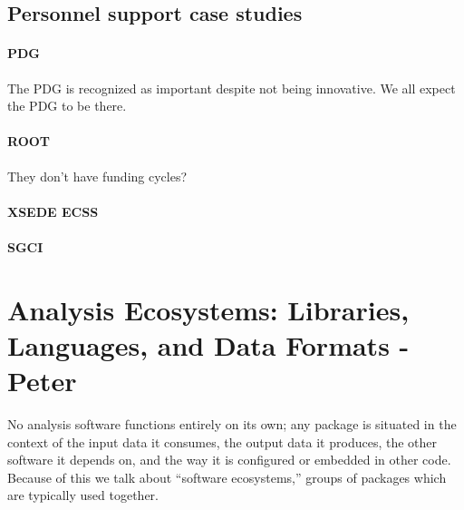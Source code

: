 \subsection{Personnel support case studies}
\paragraph{PDG}
The PDG is recognized as important despite not being innovative.  We all expect the PDG to be there.

\paragraph{ROOT}
They don't have funding cycles?

\paragraph{XSEDE ECSS}

\paragraph{SGCI}




\section{Analysis Ecosystems: Libraries, Languages, and Data Formats - Peter}
No analysis software functions entirely on its own; any package is situated in the context of the input data it consumes, the output data it produces, the other software it depends on, and the way it is configured or embedded in other code. Because of this we talk about ``software ecosystems,'' groups of packages which are typically used together.


